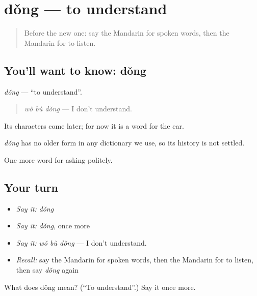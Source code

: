 \section[dǒng]{dǒng — to understand}

\label{lesson:ZH-C53-dong}



\begin{quote}
Before the new one: say the Mandarin for spoken words, then the Mandarin for to listen.
\end{quote}

\subsection*{You'll want to know: dǒng}
\emph{dǒng} — \textquotedblleft{}to understand\textquotedblright{}.

\begin{quote}
\emph{wǒ bù dǒng} — I don't understand.
\end{quote}

Its characters come later; for now it is a word for the ear.

\begin{cousinweb}
\emph{dǒng} has no older form in any dictionary we use, so its history is not settled.
\end{cousinweb}

\begin{grammarlens}[title={What you've built}]
One more word for asking politely.
\end{grammarlens}

\subsection*{Your turn}
\begin{itemize}
\raggedright
  \item \emph{Say it:} \emph{dǒng}
  \item \emph{Say it:} \emph{dǒng}, once more
  \item \emph{Say it:} \emph{wǒ bù dǒng} — I don't understand.
  \item \emph{Recall:} say the Mandarin for spoken words, then the Mandarin for to listen, then say \emph{dǒng} again
\end{itemize}

\begin{tcolorbox}[breakable,colback=teal!4,colframe=teal!35!black,title={Before you move on}]
What does dǒng mean? (\textquotedblleft{}To understand\textquotedblright{}.) Say it once more.
\end{tcolorbox}
